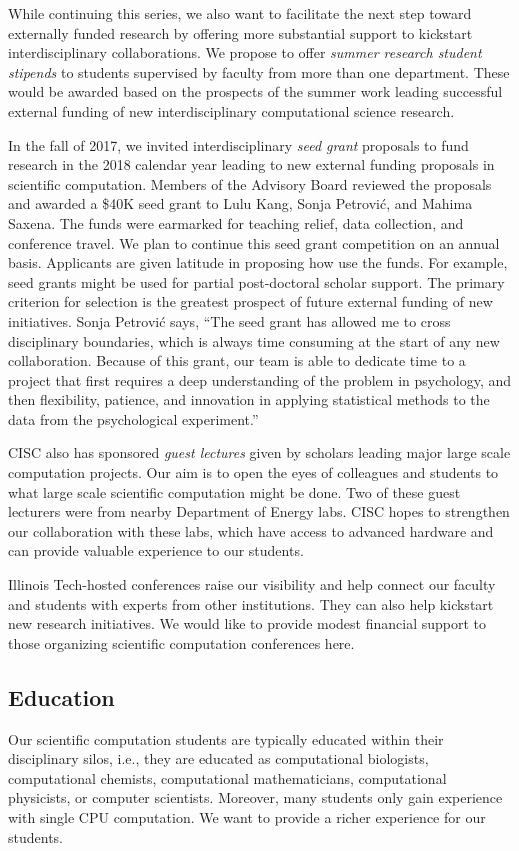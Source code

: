 \documentclass[12pt]{amsart}
\begin{document}
While continuing this series, we also want to facilitate the next step toward externally funded research by offering more substantial support to kickstart interdisciplinary collaborations.  We propose to offer \emph{summer research student stipends} to students supervised by faculty from more than one department.  These would be awarded based on the prospects of the summer work leading successful external funding of new interdisciplinary computational science research. 

In the fall of 2017, we invited interdisciplinary \emph{seed grant} proposals to fund research in the 2018 calendar year leading to new external funding proposals in scientific computation.  Members of the Advisory Board reviewed the proposals and awarded a \$40K seed grant to Lulu Kang, Sonja Petrovi\'c, and Mahima Saxena. The funds were earmarked for teaching relief, data collection, and conference travel.  We plan to continue this seed grant competition on an annual basis.  Applicants are given latitude in proposing how use the funds.  For example, seed grants might be used for partial post-doctoral scholar support.  The primary criterion for selection is the greatest prospect of future external funding of new initiatives. Sonja Petrovi\'c says, ``The seed grant has allowed me to cross disciplinary boundaries, which is always time consuming at the start of any new collaboration.  Because of this grant, our team is able to dedicate time to a project that first requires a deep understanding of the problem in psychology, and then flexibility, patience, and innovation in applying statistical methods to the data from the psychological experiment.''

CISC also has sponsored \emph{guest lectures} given by scholars leading major large scale computation projects. Our aim is to open the eyes of colleagues and students to what large scale scientific computation might be done.  Two of these guest lecturers were from nearby Department of Energy labs.  CISC hopes to strengthen our collaboration with these labs, which have access to advanced hardware and can provide valuable experience to our students.

Illinois Tech-hosted conferences raise our visibility and help connect our faculty and students with experts from other institutions.  They can also help kickstart new research initiatives.  We would like to provide modest financial support to those organizing scientific computation conferences here.


\subsection*{Education} Our scientific computation students are typically educated within their disciplinary silos, i.e., they are educated as computational biologists, computational chemists, computational mathematicians, computational physicists, or computer scientists.  Moreover, many students only gain experience with single CPU computation. We want to provide a richer experience for our students.
\end{document}
